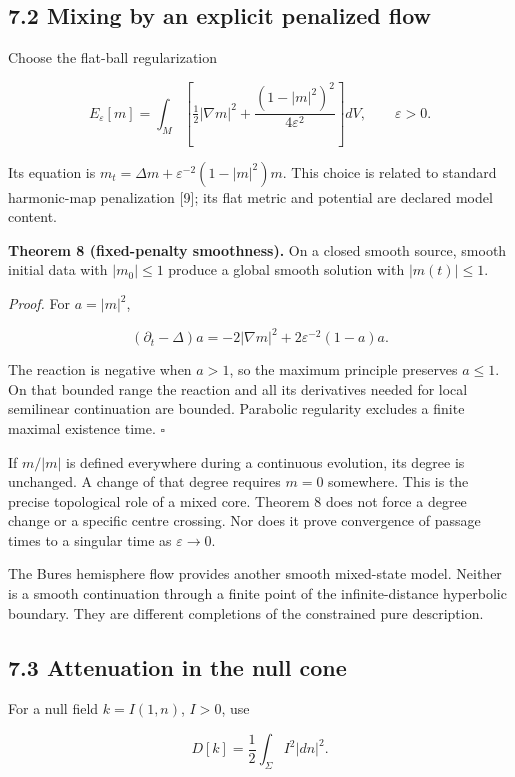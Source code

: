\documentclass[
  11pt,
  a4paper,
]{article}
\begin{document}
\subsection{7.2 Mixing by an explicit penalized flow}\label{mixing-by-an-explicit-penalized-flow}

Choose the flat-ball regularization

\[
E_\varepsilon[m]=\int_M\left[
\tfrac12|\nabla m|^2+\frac{(1-|m|^2)^2}{4\varepsilon^2}\right]dV,
\qquad \varepsilon>0.
\]

Its equation is \(m_t=\Delta m+\varepsilon^{-2}(1-|m|^2)m\). This choice is related to standard harmonic-map penalization {[}9{]}; its flat metric and potential are declared model content.

\textbf{Theorem 8 (fixed-penalty smoothness).} On a closed smooth source, smooth initial data with \(|m_0|\leq1\) produce a global smooth solution with \(|m(t)|\leq1\).

\emph{Proof.} For \(a=|m|^2\),

\[
(\partial_t-\Delta)a=-2|\nabla m|^2
+2\varepsilon^{-2}(1-a)a.
\]

The reaction is negative when \(a>1\), so the maximum principle preserves \(a\leq1\). On that bounded range the reaction and all its derivatives needed for local semilinear continuation are bounded. Parabolic regularity excludes a finite maximal existence time. \(\square\)

If \(m/|m|\) is defined everywhere during a continuous evolution, its degree is unchanged. A change of that degree requires \(m=0\) somewhere. This is the precise topological role of a mixed core. Theorem 8 does not force a degree change or a specific centre crossing. Nor does it prove convergence of passage times to a singular time as \(\varepsilon\to0\).

The Bures hemisphere flow provides another smooth mixed-state model. Neither is a smooth continuation through a finite point of the infinite-distance hyperbolic boundary. They are different completions of the constrained pure description.

\subsection{7.3 Attenuation in the null cone}\label{attenuation-in-the-null-cone}

For a null field \(k=I(1,n)\), \(I>0\), use

\[
D[k]=\frac12\int_\Sigma I^2|dn|^2.
\]
\end{document}
